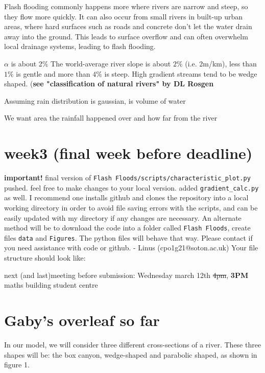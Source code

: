 \documentclass[12pt]{article}
\begin{document}
Flash flooding commonly happens more where rivers are narrow and steep, so they flow more quickly. It can also occur from small rivers in built-up urban areas, where hard surfaces such as roads and concrete don't let the water drain away into the ground. This leads to surface overflow and can often overwhelm local drainage systems, leading to flash flooding.

$\alpha$ is about 2$\%$
The world-average river slope is about $2\%$ (i.e. 2m/km), less than $1\%$ is gentle and more than $4\%$ is steep.
High gradient streams tend to be wedge shaped. (\textbf{see "classification of natural rivers" by DL Rosgen}


Assuming rain distribution is gaussian, is volume of water

We want area the rainfall happened over and how far from the river
\section{week3 (final week before deadline)}
\textbf{important!} 
final version of \verb|Flash Floods/scripts/characteristic_plot.py| pushed. feel free to make changes to your local version. added \verb|gradient_calc.py| as well.
I recommend one installs github and clones the repository into a local working directory in order to avoid file saving errors with the scripts, and can be easily updated with my directory if any changes are necessary. An
alternate method will be to download the code into a folder called \verb|Flash Floods|, create files \verb|data| and \verb|Figures|. The python files will behave that way. Please contact if you need assistance with code or github. - Linus (cpo1g21@soton.ac.uk)
Your file structure should look like:

next (and last)meeting before submission: Wednesday march 12th \st{4pm}, \textbf{3PM} maths building student centre

\section{Gaby's overleaf so far}
In our model, we will consider three different cross-sections of a river.  These three shapes will be: the box canyon, wedge-shaped and parabolic shaped, as shown in figure 1.
\end{document}
